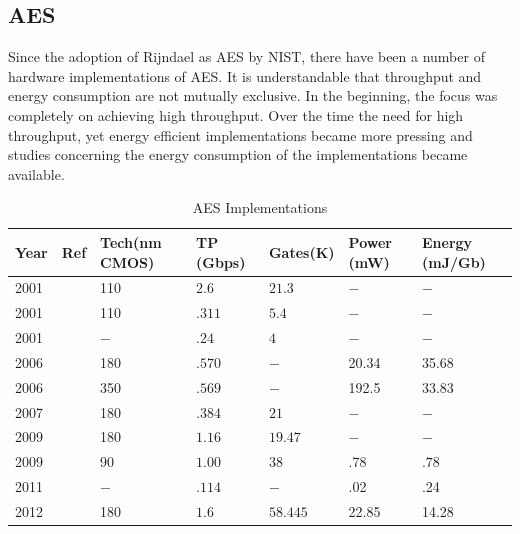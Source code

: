 \documentclass[lnicst,sechang,a4paper]{svmultln}
\begin{document}
\subsection{AES}
\label{sec:aes}
Since the adoption of Rijndael as AES by NIST, there have been a number of hardware implementations of AES. It is understandable that throughput and energy consumption are not mutually exclusive. In the beginning, the focus was completely on achieving high throughput. Over the time the need for high throughput, yet energy efficient implementations became more pressing and studies concerning the energy consumption of the implementations became available.
\begin{table}
\begin{center}
\begin{tabular}{|p{}
				|p{}
				|p{}
				|p{}
				|p{}
				|p{}
				|p{}|
				}
\hline
Year & Ref & Tech(nm CMOS)& TP (Gbps) & Gates(K) & Power (mW) & Energy (mJ/Gb) \\
\hline
2001 & \cite{IBM_Japan_2001} & 110 & $2.6$ &$21.3$  & $-$ & $-$ \\ \hline
2001 & \cite{IBM_Japan_2001} & 110 & $.311$ &$5.4$  & $-$ & $-$ \\ \hline
2001 & \cite{IBM_India_IIT_2001} & $-$ & $.24$ &$4$  & $-$ & $-$ \\ \hline
2006 & \cite{Taiwan_2006} & 180 & $.570$ & $-$ &20.34 & 35.68 \\ \hline
2006 & \cite{Taiwan_2006} & 350 & $.569$ & $-$ &192.5 & 33.83 \\ \hline
2007 & \cite{IIT_Kharagpur_2007} & 180 & $.384$ &$21$ & $-$  & $-$ \\ \hline
2009 & \cite{IME_China_Tsinghua_Univerisity_2009} & 180 & $1.16$ &$19.47$ & $-$ & $-$ \\ \hline
2009 & \cite{Ruhr_2009} &90&$ 1.00$ &$38$ &.78 & $ .78$ \\ \hline
2011 & \cite{Ruhr_2011} & $-$ & $.114$ &$ - $ &.02 & .24 \\ \hline
2012 & \cite{Pune_2012} & 180 & $1.6$ &$58.445$ &22.85 & 14.28 \\ \hline
\end{tabular}
\end{center}
\caption{AES Implementations}
\label{table:aes_implementation}
\end{table}
\end{document}
